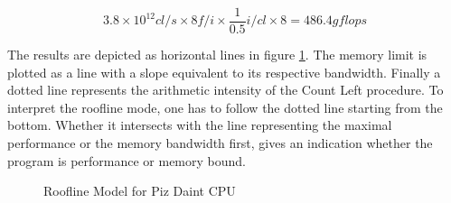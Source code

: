 \documentclass[]{article}
\begin{document}
\begin{center}
	\begin{equation}
	3.8 \times 10^{12} cl/s \times 8 f/i \times \frac{1}{0.5} i/cl \times 8 = 486.4 gflops
	\end{equation}
	\label{eq:daintp3}
\end{center}

The results are depicted as horizontal lines in figure \ref{fig:roofdaint}. The memory limit is plotted as a line with a slope equivalent to its respective bandwidth. Finally a dotted line represents the arithmetic intensity of the Count Left procedure. 
To interpret the roofline mode, one has to follow the dotted line starting from the bottom. Whether it intersects with the line representing the maximal performance or the memory bandwidth first, gives an indication whether the program is performance or memory bound. 

\begin{figure}[H]
	\begin{center}
	\caption{Roofline Model for Piz Daint CPU}
	\label{fig:roofdaint}
	\end{center}
\end{figure}
\end{document}
